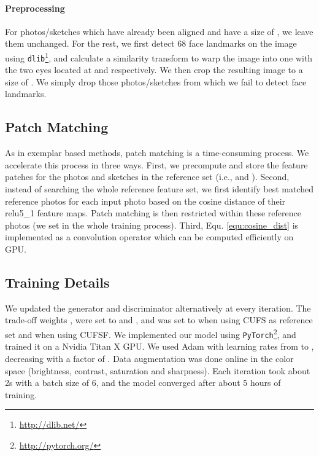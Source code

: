 \documentclass[runningheads]{llncs}
\begin{document}
\paragraph{Preprocessing} For photos/sketches which have already been aligned and have a size of , we leave them unchanged. For the rest, we first detect 68 face landmarks on the image using \texttt{dlib}\footnote{\url{http://dlib.net/}}, and calculate a similarity transform to warp the image into one with the two eyes located at  and  respectively. We then crop the resulting image to a size of . We simply drop those photos/sketches from which we fail to detect face landmarks.

\subsection{Patch Matching}
As in exemplar based methods, patch matching is a time-consuming process. We accelerate this process in three ways. First, we precompute and store the feature patches for the photos and sketches in the reference set (i.e.,  and ). Second, instead of searching the whole reference feature set, we first identify  best matched reference photos for each input photo based on the cosine distance of their relu5\_1 feature maps. Patch matching is then restricted within these  reference photos (we set  in the whole training process). Third, Equ. \ref{equ:cosine_dist} is implemented as a convolution operator which can be computed efficiently on GPU.

\subsection{Training Details}

We updated the generator and discriminator alternatively at every iteration. The trade-off weights ,   were set to  and , and  was set to  when using CUFS as reference set and  when using CUFSF. We implemented our model using \texttt{PyTorch}\footnote{\url{http://pytorch.org/}}, and trained it on a Nvidia Titan X GPU. We used Adam \cite{kingma2014adam} with learning rates from  to , decreasing with a factor of . Data augmentation was done online in the color space (brightness, contrast, saturation and sharpness). Each iteration took about 2s with a batch size of 6, and the model converged after about 5 hours of training.
\end{document}
